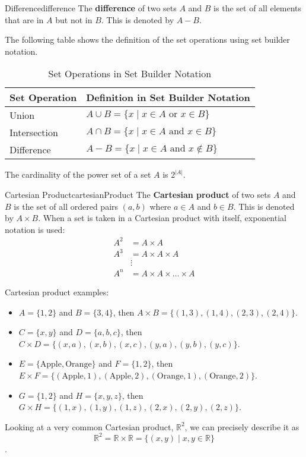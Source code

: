 \begin{definition}{Difference}{difference}
  The \textbf{difference} of two sets \( A \) and \( B \) is the set of all
  elements that are in \( A \) but not in \( B \). This is denoted by \( A - B \).
\end{definition}

The following table shows the definition of the set operations using set builder notation.
\begin{table}[H]
  \centering
  \begin{tabular}{p{1in} p{3in}}
    \toprule
    \textbf{Set Operation} & \textbf{Definition in Set Builder Notation} \\
    \midrule
    Union & \( A \cup B = \{ x \mid x \in A \text{ or } x \in B \} \) \\
    Intersection & \( A \cap B = \{ x \mid x \in A \text{ and } x \in B \} \) \\
    Difference & \( A - B = \{ x \mid x \in A \text{ and } x \notin B \} \) \\
    \bottomrule
  \end{tabular}
  \caption{Set Operations in Set Builder Notation}
\end{table}

The cardinality of the power set of a set \( A \) is \( 2^{|A|} \).

\begin{definition}{Cartesian Product}{cartesianProduct}
  The \textbf{Cartesian product} of two sets \( A \) and \( B \) is the set of all
  ordered pairs \( (a, b) \) where \( a \in A \) and \( b \in B \). This is denoted by
  \( A \times B \).
  \medskip
  When a set is taken in a Cartesian product with itself, exponential notation is used:
  \begin{align*}
    A^2 &= A \times A \\
    A^3 &= A \times A \times A \\
    &\vdots \\
    A^n &= A \times A \times \ldots \times A
  \end{align*}
\end{definition}
Cartesian product examples:
\begin{itemize}
  \item \( A = \{ 1, 2 \} \) and \( B = \{ 3, 4 \} \), then
    \( A \times B = \{ (1, 3), (1, 4), (2, 3), (2, 4) \} \).
  \item \( C = \{ x, y \} \) and \( D = \{ a, b, c \} \),
    then \( C \times D = \{ (x, a), (x, b), (x, c), (y, a), (y, b), (y, c) \} \).
  \item \( E = \{ \text{Apple}, \text{Orange} \} \)
     and \( F = \{ 1, 2 \} \), then \\
     \( E \times F = \{ (\text{Apple}, 1), (\text{Apple}, 2), (\text{Orange}, 1), (\text{Orange}, 2) \} \).
  \item \( G = \{ 1, 2 \} \) and \( H = \{ x, y, z \} \), then \( G \times H = \{ (1, x), (1, y), (1, z), (2, x), (2, y), (2, z) \} \).
\end{itemize}

Looking at a very common Cartesian product, \( \mathbb{R}^2 \), we can precisely describe it
as
\[
  \mathbb{R}^2 = \mathbb{R} \times \mathbb{R} = \{ (x, y) \mid x, y \in \mathbb{R} \}
\].

